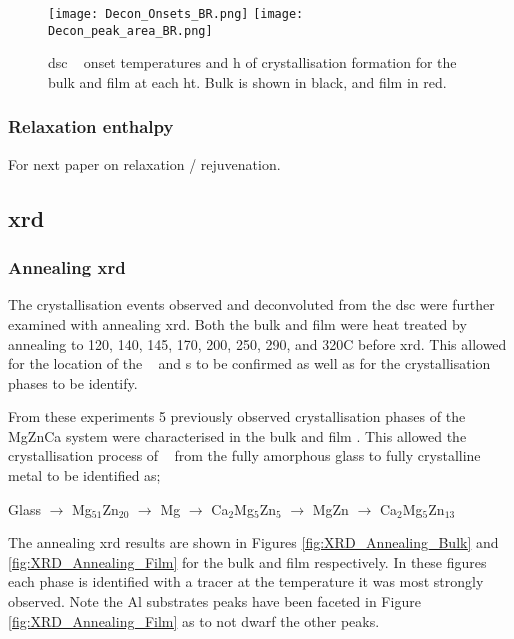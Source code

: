 \documentclass[a4paper,12pt,oneside]{article}%
\begin{document}
\begin{figure}[b]
	\centering
	\texttt{[image: Decon\_Onsets\_BR.png]}
	\medskip
	\texttt{[image: Decon\_peak\_area\_BR.png]}
	\caption{\acrshort{dsc} \Tx~ onset temperatures and \acrfull{h} of crystallisation formation for the bulk and film at each \acrfull{ht}. Bulk is shown in black, and film in red.}
	\label{fig:DSC_Decon}
\end{figure}

\subsubsection{Relaxation enthalpy}

For next paper on relaxation / rejuvenation.

\subsection{\acrshort{xrd}}
\subsubsection{Annealing \acrshort{xrd}}

The crystallisation events observed and deconvoluted from the \acrshort{dsc} were further examined with annealing \acrshort{xrd}. Both the bulk and film were heat treated by annealing to 120, 140, 145, 170, 200, 250, 290, and 320\degree C before \acrshort{xrd}. This allowed for the location of the \Tg~ and \Tx s to be confirmed as well as for the crystallisation phases to be identify.

From these experiments 5 previously observed crystallisation phases of the MgZnCa system \cite{Zhang2013, Zhang2012, Zhang2011, Khan1989, Cao2016} were characterised in the bulk and film \MgZnCa. This allowed the crystallisation process of \MgZnCa~ from the fully amorphous glass to fully crystalline metal to be identified as;

\centerline{Glass $\rightarrow$ Mg$_{51}$Zn$_{20}$ $\rightarrow$ Mg $\rightarrow$ Ca$_{2}$Mg$_{5}$Zn$_{5}$ $\rightarrow$ MgZn $\rightarrow$ Ca$_{2}$Mg$_{5}$Zn$_{13}$}

The annealing \acrshort{xrd} results are shown in Figures \ref{fig:XRD_Annealing_Bulk} and \ref{fig:XRD_Annealing_Film} for the bulk and film respectively. In these figures each phase is identified with a tracer at the temperature it was most strongly observed. Note the Al substrates peaks have been faceted in Figure \ref{fig:XRD_Annealing_Film} as to not dwarf the other peaks. 
\end{document}
